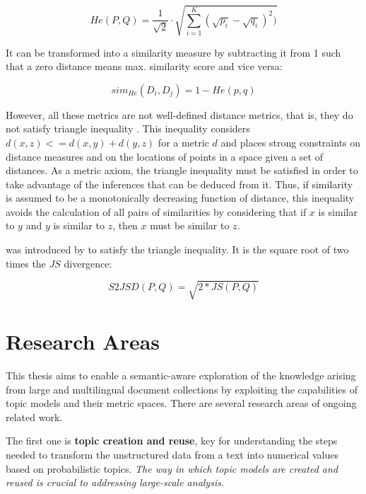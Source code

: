 \begin{equation}
	He(P, Q) = \frac{1}{\sqrt{2}}\cdot\sqrt{\sum\limits_{i=1}^K (\sqrt{p_i} - \sqrt{q_i})^2)}
	\label{eq:hedistance}
\end{equation}

It can be transformed into a similarity measure by subtracting it from 1 \citep{Rus2013} such that a zero distance means max. similarity score and vice versa:

\begin{equation}
	sim_{He}(D_i, D_j) = 1 - He(p,q)
	\label{eq:simhe}
\end{equation}

However, all these metrics are not well-defined distance metrics, that is, they do not satisfy triangle inequality \citep{Charikar2002}. This inequality considers $d(x, z) <= d(x, y) + d(y, z)$ for a metric $d$ \citep{Griffiths2007} and places strong constraints on distance measures and on the locations of points in a space given a set of distances. As a metric axiom, the triangle inequality must be satisfied in order to take advantage of the inferences that can be deduced from it. Thus, if similarity is assumed to be a monotonically decreasing function of distance, this inequality avoids the calculation of all pairs of similarities by considering that if $x$ is similar to $y$ and $y$ is similar to $z$, then $x$ must be similar to $z$. 

 was introduced by \citep{Endres2003} to satisfy the triangle inequality. It is the square root of two times the $JS$ divergence:

\begin{equation}
    S2JSD(P,Q) = \sqrt{2*JS(P,Q)}
\label{eq:s2jsd}
\end{equation}

\section{Research Areas}
\label{sec:research-topic}

This thesis aims to enable a semantic-aware exploration of the knowledge arising from large and multilingual document collections by exploiting the capabilities of topic models and their metric spaces. There are several research areas of ongoing related work. 

The first one is \textbf{topic creation and reuse}, key for understanding the steps needed to transform the unstructured data from a text into numerical values based on probabilistic topics. \textit{The way in which topic models are created and reused is crucial to addressing large-scale analysis}. 

